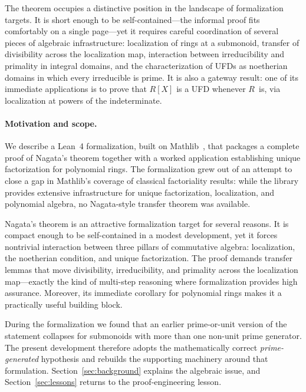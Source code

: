 \documentclass[11pt]{article}
\theoremstyle{plain}
\theoremstyle{definition}
\theoremstyle{remark}
\begin{document}
The theorem occupies a distinctive position in the landscape of formalization
targets.  It is short enough to be self-contained---the informal proof fits
comfortably on a single page---yet it requires careful coordination of several
pieces of algebraic infrastructure: localization of rings at a submonoid,
transfer of divisibility across the localization map, interaction between
irreducibility and primality in integral domains, and the characterization of
UFDs as noetherian domains in which every irreducible is prime.  It is also a
gateway result: one of its immediate applications is to prove that $R[X]$ is a
UFD whenever $R$~is, via localization at powers of the indeterminate.

\paragraph{Motivation and scope.}
We describe a Lean~4 formalization, built on Mathlib~\cite{mathlib}, that
packages a complete proof of Nagata's theorem together with a worked
application establishing unique factorization for polynomial rings.  The
formalization grew out of an attempt to close a gap in Mathlib's coverage of
classical factoriality results: while the library provides extensive
infrastructure for unique factorization, localization, and polynomial algebra,
no Nagata-style transfer theorem was available.

Nagata's theorem is an attractive formalization target for several reasons.
It is compact enough to be self-contained in a modest development, yet it
forces nontrivial interaction between three pillars of commutative algebra:
localization, the noetherian condition, and unique factorization.  The proof
demands transfer lemmas that move divisibility, irreducibility, and primality
across the localization map---exactly the kind of multi-step reasoning where
formalization provides high assurance.  Moreover, its immediate corollary for
polynomial rings makes it a practically useful building block.

During the formalization we found that an earlier prime-or-unit version of the
statement collapses for submonoids with more than one non-unit prime
generator.  The present development therefore adopts the mathematically correct
\emph{prime-generated} hypothesis and rebuilds the supporting machinery around
that formulation.  Section~\ref{sec:background} explains the algebraic issue,
and Section~\ref{sec:lessons} returns to the proof-engineering lesson.
\end{document}
